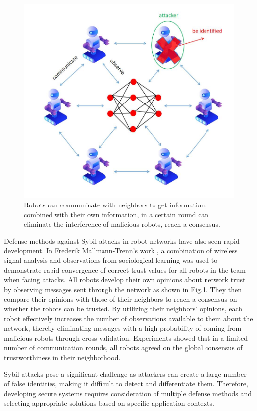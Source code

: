 \documentclass[conference]{IEEEtran}
\begin{document}
\begin{figure}[htbp]
    \centerline{\includegraphics[width=0.8\linewidth,height=0.6\linewidth]{picture/robot.jpg}}
    \caption{Robots can communicate with neighbors to get information, combined with their own information, in a certain round can eliminate the interference of malicious robots, reach a consensus.}
    \label{fig15}
\end{figure}

Defense methods against Sybil attacks in robot networks have also seen rapid development. 
In Frederik Mallmann-Trenn's work \cite{b128}, a combination of wireless signal analysis and 
observations from sociological learning was used to demonstrate rapid convergence of correct trust 
values for all robots in the team when facing attacks. All robots develop their own opinions 
about network trust by observing messages sent through the network as shown in Fig.\ref{fig15}. They 
then compare their opinions with those of their neighbors to reach a consensus on whether the 
robots can be trusted. By utilizing their neighbors' opinions, each robot effectively increases 
the number of observations available to them about the network, thereby eliminating messages with 
a high probability of coming from malicious robots through cross-validation. Experiments showed 
that in a limited number of communication rounds, all robots agreed on the global consensus of 
trustworthiness in their neighborhood.

Sybil attacks pose a significant challenge as attackers can create a large number of false 
identities, making it difficult to detect and differentiate them. Therefore, developing 
secure systems requires consideration of multiple defense methods and selecting appropriate
solutions based on specific application contexts. 
\end{document}
